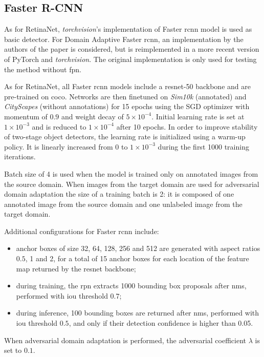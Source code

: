 \documentclass[%
    corpo=12pt,
    twoside,
    stile=classica,   
    tipotesi=magistrale,
    evenboxes,
    english,
	numerazioneromana,
]{toptesi}
\begin{document}
\subsection{Faster R-CNN}
As for RetinaNet, \textit{torchvision}'s implementation of Faster \gls{rcnn} model is used as basic detector\cite{torchvision_fasterrcnn}. For Domain Adaptive Faster \gls{rcnn}, an implementation by the authors of the paper\cite{chen2018domain} is considered\cite{dafasterrcnn_github}, but is reimplemented in a more recent version of PyTorch and \textit{torchvision}. The original implementation is only used for testing the method without \gls{fpn}.

\bigskip
As for RetinaNet, all Faster \gls{rcnn} models include a \gls{resnet}-50 backbone and are pre-trained on \gls{coco}. Networks are then finetuned on \textit{Sim10k} (annotated) and \textit{CityScapes} (without annotations) for 15 epochs using the SGD optimizer with momentum of $0.9$ and weight decay of $5\times 10^{-4}$. Initial learning rate is set at $1\times 10^{-3}$ and is reduced to $1\times 10^{-4}$ after 10 epochs. In order to improve stability of two-stage object detectors, the learning rate is initialized using a warm-up policy. It is linearly increased from 0 to $1 \times 10^{-3}$ during the first 1000 training iterations.

Batch size of 4 is used when the model is trained only on annotated images from the source domain. When images from the target domain are used for adversarial domain adaptation the size of a training batch is 2: it is composed of one annotated image from the source domain and one unlabeled image from the target domain.

\medskip
Additional configurations for Faster \gls{rcnn} include:
\begin{itemize}
	\item anchor boxes of size 32, 64, 128, 256 and 512 are generated with aspect ratios $0.5$, 1 and 2, for a total of 15 anchor boxes for each location of the feature map returned by the \gls{resnet} backbone;
	\item during training, the \gls{rpn} extracts 1000 bounding box proposals after \gls{nms}, performed with \gls{iou} threshold $0.7$;
	\item during inference, 100 bounding boxes are returned after \gls{nms}, performed with \gls{iou} threshold $0.5$, and only if their detection confidence is higher than 0.05.
\end{itemize}

When adversarial domain adaptation is performed, the adversarial coefficient $\lambda$ is set to $0.1$.
\end{document}
